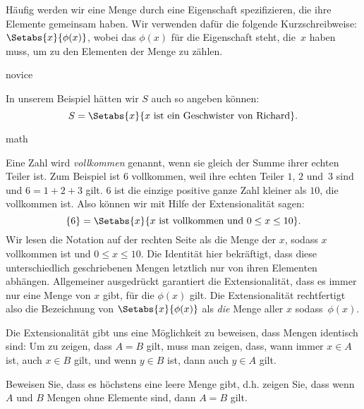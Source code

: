 \documentclass[../../../include/open-logic-section]{subfiles}
\begin{document}
Häufig werden wir eine Menge durch eine Eigenschaft spezifizieren, die ihre Elemente
gemeinsam haben. Wir verwenden dafür die folgende Kurzschreibweise:
$\Setabs{x}{\phi(x)}$, wobei das $\phi(x)$ für die Eigenschaft steht,
die~$x$ haben muss, um zu den Elementen der Menge zu zählen.

\begin{tagblock}{novice}
\begin{ex}
In unserem Beispiel hätten wir $S$ auch so angeben können:
\[
S = \Setabs{x}{x \text{ ist ein Geschwister von Richard}}.
\]
\end{ex}
\end{tagblock}

\begin{tagblock}{math}
\begin{ex}
Eine Zahl wird \emph{vollkommen} genannt, wenn sie gleich der Summe ihrer
echten Teiler ist. Zum Beispiel ist $6$ vollkommen, weil ihre
echten Teiler $1$, $2$ und~$3$ sind und $6 = 1 + 2 + 3$ gilt. $6$ ist die einzige positive ganze Zahl kleiner als $10$, die vollkommen ist. Also
können wir mit Hilfe der Extensionalität sagen:
\[
	\{6\} = \Setabs{x}{x\text{ ist vollkommen und }0 \leq x \leq 10}.
\]
Wir lesen die Notation auf der rechten Seite als \glqq die Menge der $x$, sodass $x$
vollkommen ist und $0 \leq x \leq 10$\grqq. Die Identität hier bekräftigt, dass diese unterschiedlich 
geschriebenen Mengen letztlich nur von ihren Elementen abhängen.
Allgemeiner ausgedrückt garantiert die Extensionalität, dass es immer
nur eine Menge von $x$ gibt, für die $\phi(x)$ gilt.
Die Extensionalität rechtfertigt also die Bezeichnung von 
$\Setabs{x}{\phi(x)}$ als \emph{die} Menge aller $x$ sodass~$\phi(x)$.
\end{ex}
\end{tagblock}

Die Extensionalität gibt uns eine Möglichkeit zu beweisen, dass Mengen identisch sind: Um zu zeigen, dass $A = B$ gilt, 
muss man zeigen, dass, wann immer $x \in A$ ist, auch $x \in B$ gilt,
und wenn $y \in B$ ist, dann auch $y \in A$ gilt.

\begin{prob}
Beweisen Sie, dass es höchstens eine leere Menge gibt, d.h. zeigen Sie, dass wenn $A$ und $B$
Mengen ohne Elemente sind, dann $A = B$ gilt.
\end{prob}
\end{document}
